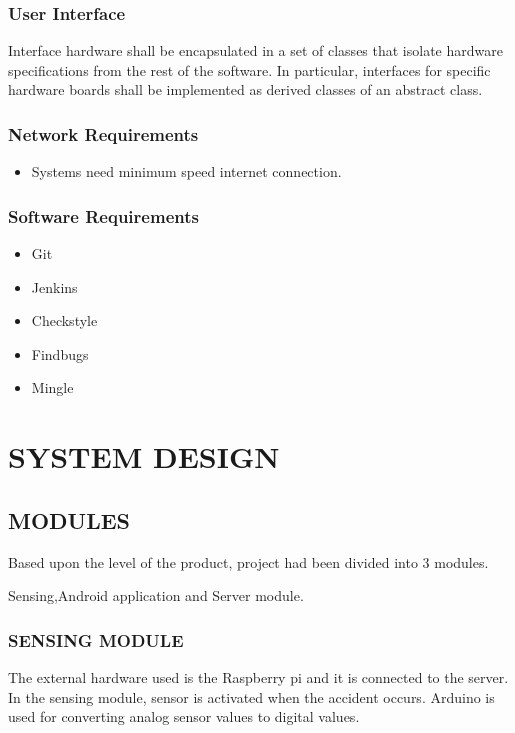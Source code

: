 \documentclass[12pt,a4paper,oneside]{report}
\begin{document}
{\subsection{User Interface}
Interface hardware shall be encapsulated in a set of classes that isolate hardware specifications from the rest of the software. In particular, interfaces for specific hardware boards shall be implemented as derived classes of an abstract class.
\\

\subsection{Network Requirements}  
\begin{itemize}
\item Systems need minimum speed internet connection.
\end{itemize}
\subsection{Software Requirements}
\begin{itemize}
\item Git
\item Jenkins
\item Checkstyle
\item Findbugs
\item Mingle
\end{itemize}
\chapter{SYSTEM DESIGN}
\section{MODULES}
\par Based upon the level of the product, project had been divided into 3 modules. 
\par Sensing,Android application and Server module.

\subsection{SENSING MODULE}
\par The external hardware used is the Raspberry pi and it is connected to the server. In the sensing module, sensor is activated when the accident occurs. Arduino is used for converting analog sensor values to digital values.

}
\end{document}
